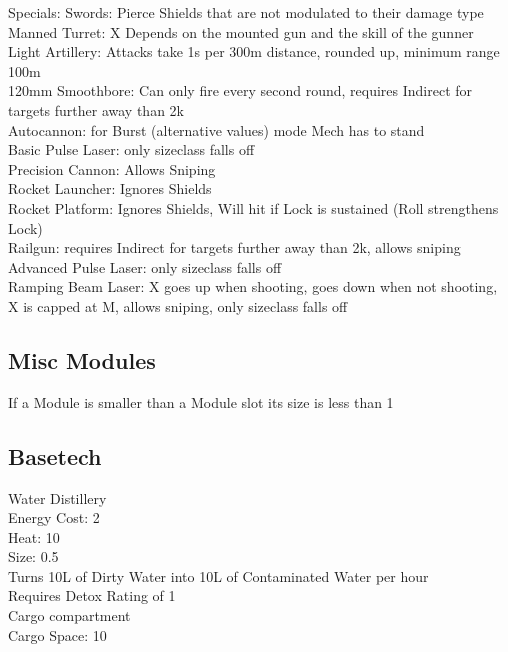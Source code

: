 Specials:
Swords: Pierce Shields that are not modulated to their damage type\\
Manned Turret: X Depends on the mounted gun and the skill of the gunner\\
Light Artillery: Attacks take 1s per 300m distance, rounded up, minimum range 100m\\
120mm Smoothbore: Can only fire every second round, requires Indirect for targets further away than 2k\\
Autocannon: for Burst (alternative values) mode Mech has to stand\\
Basic Pulse Laser: only sizeclass falls off\\
Precision Cannon: Allows Sniping \\
Rocket Launcher: Ignores Shields \\
Rocket Platform: Ignores Shields, Will hit if Lock is sustained (Roll strengthens Lock)\\
Railgun: requires Indirect for targets further away than 2k, allows sniping\\
Advanced Pulse Laser: only sizeclass falls off\\
Ramping Beam Laser: X goes up when shooting, goes down when not shooting, X is capped at M, allows sniping,
        only sizeclass falls off\\
\subsection{Misc Modules}\label{subsec:miscModules}
If a Module is smaller than a Module slot its size is less than 1
\newline
\subsection{Basetech}\label{subsec:basetech}
Water Distillery \\
Energy Cost: 2\\
Heat: 10\\
Size: 0.5\\
Turns 10L of Dirty Water into 10L of Contaminated Water per hour\\
Requires Detox Rating of 1\\
\newline
Cargo compartment\\
Cargo Space: 10 \\
\newline
